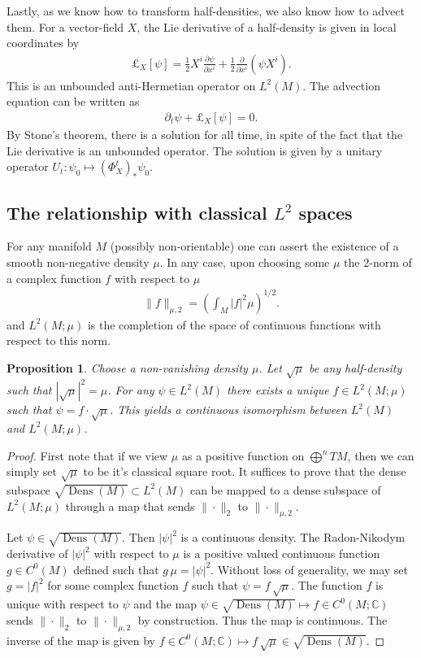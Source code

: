 \documentclass[12pt]{amsart}
\newcommand{\pder}[2]{\ensuremath{\frac{ \partial #1}{\partial #2}}}
\newtheorem{prop}[thm]{Proposition}
\DeclareMathOperator{\Dens}{Dens}
\begin{document}
Lastly, as we know how to transform half-densities, we also know how to advect them.
For a vector-field $X$, the Lie derivative of a half-density is given in local coordinates by
\begin{align}
	\pounds_{X}[\psi] = \frac{1}{2} X^{i} \pder{\psi}{x^{i}} + \frac{1}{2} \pder{}{x^{i}} \left( \psi X^{i} \right). \label{eq:half density pde}
\end{align}
This is an unbounded anti-Hermetian operator on $L^{2}(M)$.
The advection equation can be written as
\begin{align*}
	\partial_{t} \psi + \pounds_{X}[\psi] = 0.
\end{align*}
By Stone's theorem, there is a solution for all time, in spite of the fact that the Lie derivative is an unbounded operator.
The solution is given by a unitary operator $U_{t}: \psi_{0} \mapsto (\Phi_{X}^{t})_{*} \psi_{0}$.


\subsection{The relationship with classical $L^{2}$ spaces}
\label{sec:classical_Lebesgue}
For any manifold $M$ (possibly non-orientable) one can assert the existence of a smooth non-negative density $\mu$.
In any case, upon choosing some $\mu$ the $2$-norm of a complex function $f$ with respect to $\mu$
\begin{align*}
	\| f \|_{\mu,2} =  \left( \int_M |f|^2 \mu \right)^{1/2}.
\end{align*}
and $L^2(M ; \mu)$ is the completion of the space of continuous functions with respect to this norm.

\begin{prop}
	Choose a non-vanishing density $\mu$.
	Let $\sqrt{\mu}$ be any half-density such that $| \sqrt{\mu} |^{2} = \mu$.
	For any $\psi \in L^2(M)$ there exists a unique $f \in L^2(M ; \mu)$ such that $\psi = f \cdot  \sqrt{\mu}$.
	This yields a continuous isomorphism between $L^2(M)$ and $L^2(M ; \mu)$.
\end{prop}
\begin{proof}
	First note that if we view $\mu$ as a positive function on $\bigoplus^n TM$, then we can simply set $\sqrt{\mu}$ to be it's classical square root.
	It suffices to prove that the dense subspace $\sqrt{\Dens(M)} \subset L^{2}(M)$ can be mapped to a dense subspace of $L^{2}(M;\mu)$ through a map that sends $\| \cdot \|_{2}$ to $\| \cdot \|_{\mu,2}$.
	
	Let $\psi \in \sqrt{\Dens(M)}$.  Then $|\psi|^2$ is a continuous density.
	The Radon-Nikodym derivative of $|\psi|^{2}$ with respect to $\mu$ is a positive valued continuous function $g \in C^0(M)$ defined such that $g \, \mu = |\psi|^2$.
	Without loss of generality, we may set $g = |f|^{2}$ for some complex function $f$ such that $\psi = f\, \sqrt{\mu}$.
	The function $f$ is unique with respect to $\psi$ and
	the map $\psi \in \sqrt{\Dens(M)} \mapsto f \in C^0(M ; \mathbb{C} )$ sends $\| \cdot \|_{2}$ to $\| \cdot \|_{\mu,2}$ by construction.
	Thus the map is continuous.
	The inverse of the map is given by $f \in C^{0}(M;\mathbb{C}) \mapsto f \, \sqrt{\mu} \in \sqrt{\Dens(M)}$.
\end{proof}
\end{document}
